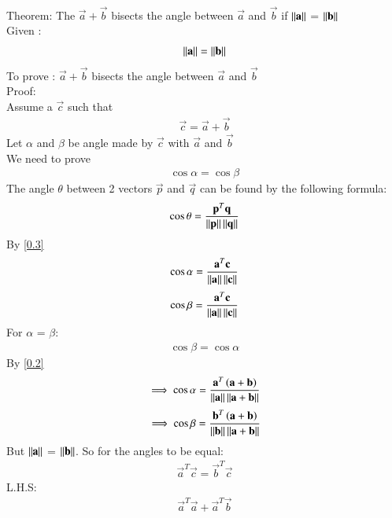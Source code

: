 \documentclass[journal]{IEEEtran}
\begin{document}
	\solution \\
	Theorem: The $\vec{a} + \vec{b}$ bisects the angle between $\vec{a}$ and $\vec{b}$ if $\left\lVert\mathbf{a}\right\rVert$ = $\left\lVert\mathbf{b}\right\rVert$ \\
	Given : 
	\begin{align}
		\left\lVert\mathbf{a}\right\rVert = \left\lVert\mathbf{b}\right\rVert \label{0.1}
	\end{align}
	To prove : $\vec{a} + \vec{b}$ bisects the angle between $\vec{a}$ and $\vec{b}$\\
	Proof: \\
	Assume a $\vec{c}$ such that
	\begin{align}
		\vec{c} = \vec{a} + \vec{b} \label{0.2}
	\end{align}	
	Let $\alpha$ and $\beta$ be angle made by $\vec{c}$ with $\vec{a}$ and $\vec{b}$ \\
	We need to prove
	\begin{align}
	\cos\alpha = \cos\beta
	\end{align}
	The angle $\theta$ between 2 vectors $\vec{p}$ and $\vec{q}$ can be found by the following formula: 
	\begin{align}
		\cos\theta = \frac{\mathbf{p}^T\mathbf{q}}{\left\lVert\mathbf{p}\right\rVert\left\lVert\mathbf{q}\right\rVert} \label{0.3}
	\end{align}
	By \eqref{0.3}
	\begin{align}
		\cos\alpha = \frac{\mathbf{a}^T\mathbf{c}}{\left\lVert\mathbf{a}\right\rVert\left\lVert\mathbf{c}\right\rVert}
	\end{align}
	\begin{align}
		\cos\beta = \frac{\mathbf{a}^T\mathbf{c}}{\left\lVert\mathbf{a}\right\rVert\left\lVert\mathbf{c}\right\rVert}
	\end{align}
	For $\alpha$ = $\beta$:
	\begin{align}
		\cos\beta = \cos\alpha
	\end{align}
	By \eqref{0.2}
	\begin{align}
		\implies \cos\alpha = \frac{\mathbf{a}^T\left(\mathbf{a}+\mathbf{b}\right)}{\left\lVert\mathbf{a}\right\rVert\left\lVert\mathbf{a}+\mathbf{b}\right\rVert}
	\end{align}
	\begin{align}
		\implies \cos\beta = \frac{\mathbf{b}^T\left(\mathbf{a}+\mathbf{b}\right)}{\left\lVert\mathbf{b}\right\rVert\left\lVert\mathbf{a}+\mathbf{b}\right\rVert}
	\end{align}
	But $\left\lVert\mathbf{a}\right\rVert$ = $\left\lVert\mathbf{b}\right\rVert$. So for the angles to be equal:
	\begin{align}
		\vec{a}^T\vec{c} = \vec{b}^T\vec{c}
	\end{align}
	L.H.S:
	\begin{align}
		\vec{a}^T\vec{a} + \vec{a}^T\vec{b}
	\end{align}
\end{document}
